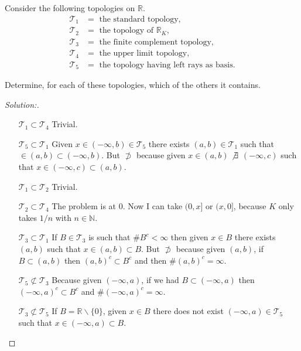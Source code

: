 \documentclass[a4paper,12pt, reqno]{article}
\theoremstyle{definition}
\newenvironment{exerr}[1]{
  \renewcommand\theexeralt{#1}
  \exeralt
}{\endexeralt}
\newenvironment{solution}{\begin{proof}[Solution:]}{\end{proof}}
\newcommand{\R}{\mathbb{R}}
\newcommand{\T}{\mathscr{T}}
\newcommand{\N}{\mathbb{N}}
\begin{document}
\begin{exerr}{7}
  Consider the following topologies on $\R$.
  \begin{align*}
    \T_{1} & = \text{ the standard topology},                  \\
    \T_{2} & = \text{ the topology of $\R_K$},                 \\
    \T_{3} & = \text{ the finite complement topology},         \\
    \T_{4} & = \text{ the upper limit topology},               \\
    \T_{5} & = \text{ the topology having left rays as basis}.
  \end{align*}

  Determine, for each of these topologies, which of the others it contains.
\end{exerr}
\begin{solution}\hfill
  \begin{itemize}
    \item[$\T_{1}\subset\T_{4}$] Trivial.
    \item[$\T_{5}\subset\T_{1}$] Given $x\in (-\infty,b)\in\T_{5}$ there exists $(a,b)\in\T_{1}$ such that $\in(a,b)\subset(-\infty,b)$. But $\not\supset$ because given $x\in(a,b)$ $\not\exists$ $(-\infty,c)$ such that $x\in(-\infty,c)\subset(a,b)$.
    \item[$\T_{1}\subset\T_{2}$] Trivial.
    \item[$\T_{2}\subset\T_{4}$] The problem is at $0$. Now I can take $(0,x]$ or $(x,0]$, because $K$ only takes $1/n$ with $n\in\N$.
    \item[$\T_{3}\subset\T_{1}$] If $B\in\T_{3}$ is such that $\# B^c<\infty$ then given $x\in B$ there exists $(a,b)$ such that $x\in(a,b)\subset B$. But $\not\supset$ because given $(a,b)$, if $B\subset(a,b)$ then $(a,b)^c\subset B^c$ and then $\#(a,b)^c=\infty$.
    \item[$\T_{5}\not\subset\T_{3}$]  Because given $(-\infty,a)$, if we had $B\subset (-\infty,a)$ then $(-\infty,a)^c\subset B^c$ and $\#(-\infty,a)^c =\infty$.
    \item[$\T_{3}\not\subset\T_{5}$] If $B = \R\backslash\{ 0 \}$, given $x\in B$ there does not exist $(-\infty,a)\in\T_{5}$ such that $x\in(-\infty,a)\subset B$.
  \end{itemize}
\end{solution}
\end{document}
